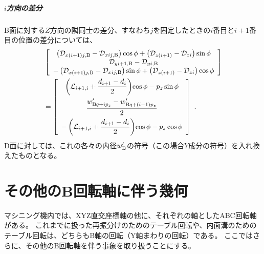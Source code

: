 \paragraph{$i$方向の差分}\noindent
B面に対する$Z$方向の隣同士の差分、すなわち$j$を固定したときの$i$番目と$i+1$番目の位置の差分については、
\begin{align*}
 &\left[
  \begin{array}{c}
    \left(\mathcal D_{x(i+1)j,\text B}-\mathcal D_{xij,\text B}\right)\cos\phi
    +\left(\mathcal D_{z(i+1)}-\mathcal D_{zi}\right)\sin\phi\\
    \mathcal D_{yi+1,\text B}-\mathcal D_{yi,\text B}\\
    -\left(\mathcal D_{x(i+1)j,\text B}-\mathcal D_{xij,\text B}\right)\sin\phi
    +\left(\mathcal D_{z(i+1)}-\mathcal D_{zi}\right)\cos\phi
  \end{array}
  \right]\\
 &= \left[
    \begin{array}{c}
      \displaystyle\left(\mathcal L_{i+1, i}+\frac{d_{i+1}-d_i}2\right)\!\cos\phi-p_z\sin\phi\\[10pt]
      \displaystyle\frac{w'_{\text Bq+ip_z}-w'_{\text Bq+(i-1)p_z}}2\\[8pt]
      \displaystyle-\left(\mathcal L_{i+1, i}+\frac{d_{i+1}-d_i}2\right)\!\cos\phi-p_z\cos\phi
    \end{array}
    \right]\ .
\end{align*}
D面に対しては、これの各々の内径$w_\text B'$の符号（この場合$Y$成分の符号）を入れ換えたものとなる。






\chapter[その他のB回転軸に伴う幾何]
        {その他のB回転軸に伴う幾何}
マシニング機内では、XYZ直交座標軸の他に、それぞれの軸としたABC回転軸がある。
これまでに扱った再振分けのためのテーブル回転や、内面溝のためのテーブル回転は、どちらもB軸の回転（Y軸まわりの回転）である。
ここではさらに、その他のB回転軸を伴う事象を取り扱うことにする。



